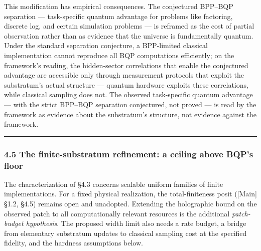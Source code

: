\documentclass[
]{article}
\begin{document}
This modification has empirical consequences. The conjectured BPP--BQP
separation --- task-specific quantum advantage for problems like
factoring, discrete log, and certain simulation problems --- is reframed
as the cost of partial observation rather than as evidence that the
universe is fundamentally quantum. Under the standard separation
conjecture, a BPP-limited classical implementation cannot reproduce all
BQP computations efficiently; on the framework's reading, the
hidden-sector correlations that enable the conjectured advantage are
accessible only through measurement protocols that exploit the
substratum's actual structure --- quantum hardware exploits these
correlations, while classical sampling does not. The observed
task-specific quantum advantage --- with the strict BPP--BQP separation
conjectured, not proved --- is read by the framework as evidence about
the substratum's structure, not evidence against the framework.

\begin{center}\rule{0.5\linewidth}{0.5pt}\end{center}

\hypertarget{the-finite-substratum-refinement-a-ceiling-above-bqps-floor}{%
\subsubsection{4.5 The finite-substratum refinement: a ceiling above
BQP's
floor}\label{the-finite-substratum-refinement-a-ceiling-above-bqps-floor}}

The characterization of §4.3 concerns scalable uniform families of
finite implementations. For a fixed physical realization, the
total-finiteness posit ({[}Main{]} §1.2, §4.5) remains open and
unadopted. Extending the holographic bound on the observed patch to all
computationally relevant resources is the additional \emph{patch-budget
hypothesis}. The proposed width limit also needs a rate budget, a bridge
from elementary substratum updates to classical sampling cost at the
specified fidelity, and the hardness assumptions below.
\end{document}
